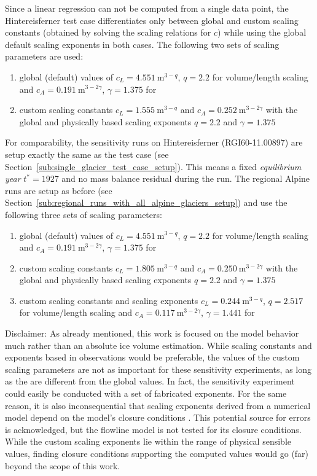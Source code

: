         Since a linear regression can not be computed from a single data point, the Hintereisferner test case differentiates only between global and custom scaling constants (obtained by solving the scaling relations for $c$) while using the global default scaling exponents in both cases. The following two sets of scaling parameters are used:
        \begin{enumerate}[label=(\alph*)]
            \item global (default) values of $c_L = \SI{4.551}{\meter^{3-q}}$, $q = 2.2$ for volume/length scaling and $c_A = \SI{0.191}{\meter^{3-2\gamma}}$, $\gamma = 1.375$ for \vas{}
            \item custom scaling constants $c_L = \SI{1.555}{\meter^{3-q}}$ and $c_A = \SI{0.252}{\meter^{3-2\gamma}}$ with the global and physically based scaling exponents $q = 2.2$ and $\gamma = 1.375$
        \end{enumerate}
        For comparability, the sensitivity runs on Hintereisferner (RGI60-11.00897) are setup exactly the same as the test case (see Section~\ref{sub:single_glacier_test_case_setup}). This means a fixed \textit{equilibrium year} $t^{*} = 1927$ and no mass balance residual during the run. The regional Alpine runs are setup as before (see Section~\ref{sub:regional_runs_with_all_alpine_glaciers_setup}) and use the following three sets of scaling parameters:
        \begin{enumerate}[label=(\alph*)]
            \item global (default) values of $c_L = \SI{4.551}{\meter^{3-q}}$, $q = 2.2$ for volume/length scaling and $c_A = \SI{0.191}{\meter^{3-2\gamma}}$, $\gamma = 1.375$ for \vas{}
            \item custom scaling constants $c_L = \SI{1.805}{\meter^{3-q}}$ and $c_A = \SI{0.250}{\meter^{3-2\gamma}}$ with the global and physically based scaling exponents $q = 2.2$ and $\gamma = 1.375$
            \item custom scaling constants and scaling exponents $c_L = \SI{0.244}{\meter^{3-q}}$, $q = 2.517$ for volume/length scaling and $c_A = \SI{0.117}{\meter^{3-2\gamma}}$, $\gamma = 1.441$ for \vas{}
        \end{enumerate}

        Disclaimer: As already mentioned, this work is focused on the model behavior much rather than an absolute ice volume estimation. While scaling constants and exponents based in observations would be preferable, the values of the custom scaling parameters are not as important for these sensitivity experiments, as long as the are different from the global values. In fact, the sensitivity experiment could easily be conducted with a set of fabricated exponents. For the same reason, it is also inconsequential that scaling exponents derived from a numerical model depend on the model's closure conditions \citep[Section 8.9]{Bahr2015}. This potential source for errors is acknowledged, but the flowline model is not tested for its closure conditions. While the custom scaling exponents lie within the range of physical sensible values, finding closure conditions supporting the computed values would go (far) beyond the scope of this work.

